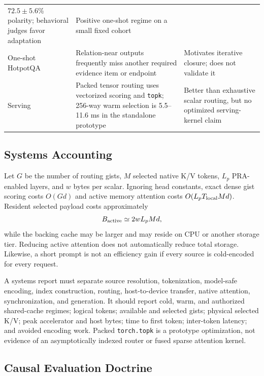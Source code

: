 \begin{table}[htbp]
\begin{tabular}{>{\raggedright\arraybackslash}p{2.5cm}>{\raggedright\arraybackslash}p{6.1cm}>{\raggedright\arraybackslash}p{5.8cm}}
$72.5\pm5.6$\% polarity; behavioral judges favor adaptation & Positive one-shot regime on a
small fixed cohort \\
One-shot HotpotQA & Relation-near outputs frequently miss another required evidence item or
endpoint & Motivates iterative closure; does not validate it \\
Serving & Packed tensor routing uses vectorized scoring and \texttt{topk}; 256-way warm
selection is 5.5--11.6 ms in the standalone prototype & Better than exhaustive scalar routing,
but no optimized serving-kernel claim \\
\bottomrule
\end{tabular}
\end{table}

\subsection{Systems Accounting}

Let $G$ be the number of routing gists, $M$ selected native K/V tokens, $L_p$ PRA-enabled
layers, and $w$ bytes per scalar. Ignoring head constants, exact dense gist scoring costs
$O(Gd)$ and active memory attention costs $O(L_pT_{\rm local}Md)$. Resident selected payload
costs approximately
\begin{equation}
B_{\rm active}\simeq 2wL_pMd,
\end{equation}
while the backing cache may be larger and may reside on CPU or another storage tier. Reducing
active attention does not automatically reduce total storage. Likewise, a short prompt is not
an efficiency gain if every source is cold-encoded for every request.

A systems report must separate source resolution, tokenization, model-safe encoding, index
construction, routing, host-to-device transfer, native attention, synchronization, and
generation. It should report cold, warm, and authorized shared-cache regimes; logical tokens;
available and selected gists; physical selected K/V; peak accelerator and host bytes; time to
first token; inter-token latency; and avoided encoding work. Packed \texttt{torch.topk} is a
prototype optimization, not evidence of an asymptotically indexed router or fused sparse
attention kernel.

\subsection{Causal Evaluation Doctrine}

